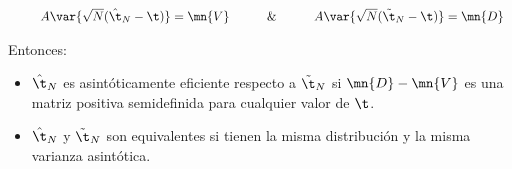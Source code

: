 $\begin{array}{llllllllllll}
     & & A\var{\sqrt{N}(\hat{\t}_N-\t)} = \mn{V} & & & \& & & & A\var{\sqrt{N}(\Tilde{\t}_N-\t)} = \mn{D}
\end{array}$

\bigskip
Entonces:
\begin{itemize}
    \item $\hat{\t}_N$ es asintóticamente eficiente respecto a $\Tilde{\t}_N$ si $\mn{D}-\mn{V}$ es una matriz positiva semidefinida para cualquier valor de $\t$.
    \item $\hat{\t}_N$ y $\Tilde{\t}_N$ son equivalentes si tienen la misma distribución y la misma varianza asintótica.
\end{itemize}